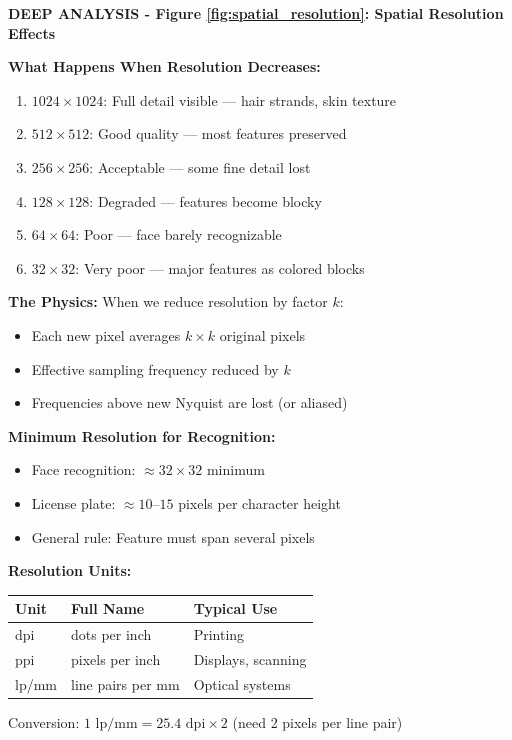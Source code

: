 \documentclass[12pt,a4paper]{article}
\begin{document}
\begin{deepexplanation}
\textbf{DEEP ANALYSIS - Figure \ref{fig:spatial_resolution}: Spatial Resolution Effects}

\textbf{What Happens When Resolution Decreases:}
\begin{enumerate}
    \item $1024 \times 1024$: Full detail visible --- hair strands, skin texture
    \item $512 \times 512$: Good quality --- most features preserved
    \item $256 \times 256$: Acceptable --- some fine detail lost
    \item $128 \times 128$: Degraded --- features become blocky
    \item $64 \times 64$: Poor --- face barely recognizable
    \item $32 \times 32$: Very poor --- major features as colored blocks
\end{enumerate}

\textbf{The Physics:}
When we reduce resolution by factor $k$:
\begin{itemize}
    \item Each new pixel averages $k \times k$ original pixels
    \item Effective sampling frequency reduced by $k$
    \item Frequencies above new Nyquist are lost (or aliased)
\end{itemize}

\textbf{Minimum Resolution for Recognition:}
\begin{itemize}
    \item Face recognition: $\approx 32 \times 32$ minimum
    \item License plate: $\approx 10$--$15$ pixels per character height
    \item General rule: Feature must span several pixels
\end{itemize}

\textbf{Resolution Units:}
\begin{center}
\begin{tabular}{|l|l|l|}
\hline
\textbf{Unit} & \textbf{Full Name} & \textbf{Typical Use} \\
\hline
dpi & dots per inch & Printing \\
ppi & pixels per inch & Displays, scanning \\
lp/mm & line pairs per mm & Optical systems \\
\hline
\end{tabular}
\end{center}

Conversion: $1 \text{ lp/mm} = 25.4 \text{ dpi} \times 2$ (need 2 pixels per line pair)
\end{deepexplanation}
\end{document}
